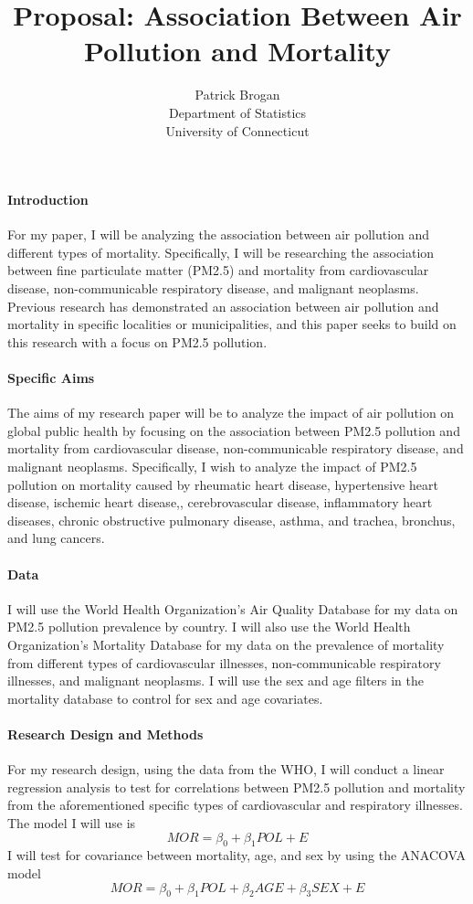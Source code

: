 \documentclass[12pt]{article}\usepackage[]{graphicx}\usepackage[]{xcolor}
\title{Proposal: Association Between Air Pollution and Mortality}
\author{Patrick Brogan\\
  Department of Statistics\\
  University of Connecticut
}
\begin{document}
\maketitle


\paragraph{Introduction}
For my paper, I will be analyzing the association between air pollution and different types of mortality. Specifically, I will be researching the association between fine particulate matter (PM2.5) and mortality from cardiovascular disease, non-communicable respiratory disease, and malignant neoplasms. Previous research has demonstrated an association between air pollution and mortality in specific localities or municipalities\citep{dockery1993association}\citep{sunyer1996air}\citep{jerrett2005spatial}, and this paper seeks to build on this research with a focus on PM2.5 pollution.

\paragraph{Specific Aims}
The aims of my research paper will be to analyze the impact of air pollution on global public health by focusing on the association between PM2.5 pollution and mortality from cardiovascular disease, non-communicable respiratory disease, and malignant neoplasms. Specifically, I wish to analyze the impact of PM2.5 pollution on mortality caused by rheumatic heart disease, hypertensive heart disease, ischemic heart disease,, cerebrovascular disease, inflammatory heart diseases, chronic obstructive pulmonary disease, asthma, and trachea, bronchus, and lung cancers.

\paragraph{Data}
I will use the World Health Organization's Air Quality Database for my data on PM2.5 pollution prevalence by country.\citep{world health organization_2022} I will also use the World Health Organization's Mortality Database for my data on the prevalence of mortality from different types of cardiovascular illnesses, non-communicable respiratory illnesses, and malignant neoplasms.\citep{world health organization_2022} I will use the sex and age filters in the mortality database to control for sex and age covariates.

\paragraph{Research Design and Methods}
For my research design, using the data from the WHO, I will conduct a linear regression analysis to test for correlations between PM2.5 pollution and mortality from the aforementioned specific types of cardiovascular and respiratory illnesses. The model I will use is
\[
  MOR = \beta_{0} + \beta_{1}POL + E
\]
I will test for covariance between mortality, age, and sex by using the ANACOVA model
\[
  MOR = \beta_{0} + \beta_{1}POL + \beta_{2}AGE + \beta_{3}SEX + E
\]
\end{document}
